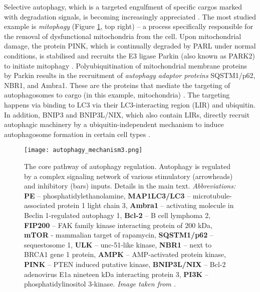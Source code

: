     Selective autophagy, which is a targeted engulfment of specific cargos marked with degradation signals, is becoming increasingly appreciated \cite{Kaur2015}. The most studied example is \textit{mitophagy} (Figure \ref{fig:corepath}, top right) -- a process specifically responsible for the removal of dysfunctional mitochondria from the cell.
    Upon mitochondrial damage, the protein PINK, which is continually degraded by PARL under normal conditions, is stabilised and recruits the E3 ligase Parkin (also known as PARK2) to initiate mitophagy \cite{Kroemer2010}. Polyubiquitination of mitochondrial membrane proteins by Parkin results in the recruitment of \textit{autophagy adaptor proteins} SQSTM1/p62, NBR1, and Ambra1. These are the proteins that mediate the targeting of autophagosomes to cargo (in this example, mitochondria) \cite{Kaur2015}. The targeting happens via binding to LC3 via their LC3-interacting region (LIR) and ubiquitin. In addition, BNIP3 and BNIP3L/NIX, which also contain LIRs, directly recruit autophagic machinery by a ubiquitin-independent mechanism to induce autophagosome formation in certain cell types \cite{Kroemer2010}.\\
    
    
     
        
             \begin{figure}[!h]
            \centering
            \texttt{[image: autophagy\_mechanism3.png]}
            \caption[The mechanism of core autophagy pathway]{The core pathway of autophagy regulation. Autophagy is regulated by a complex signaling network of various stimulatory (arrowheads) and inhibitory (bars) inputs. Details in the main text. \textit{Abbreviations:} \textbf{PE} -- phosphatidylethanolamine, \textbf{MAP1LC3/LC3} -- microtubule-associated protein 1 light chain 3, \textbf{Ambra1} -- activating molecule in Beclin 1-regulated autophagy 1, \textbf{Bcl-2} -- B cell lymphoma 2, \textbf{FIP200} -- FAK family kinase interacting protein of 200 kDa, \textbf{mTOR} - mammalian target of rapamycin, \textbf{SQSTM1/p62} -- sequestosome 1, \textbf{ULK} -- unc-51-like kinase, \textbf{NBR1} -- next to BRCA1 gene 1 protein, \textbf{AMPK} -- AMP-activated protein kinase, \textbf{PINK} -- PTEN induced putative kinase, \textbf{BNIP3L/NIX} -- Bcl-2 adenovirus E1a nineteen kDa interacting protein 3, \textbf{PI3K} -- phosphatidylinositol 3-kinase. \textit{Image taken from \cite{AutophagyTechnology}.}
            }
            \label{fig:corepath}
            \end{figure} 

